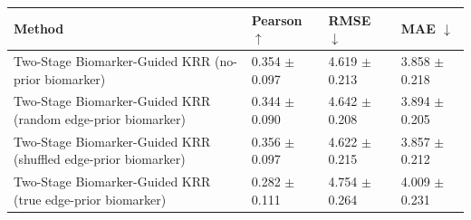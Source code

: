 \begin{tabular}{llll}
\toprule
Method & Pearson $\uparrow$ & RMSE $\downarrow$ & MAE $\downarrow$ \\
\midrule
Two-Stage Biomarker-Guided KRR (no-prior biomarker) & 0.354 $\pm$ 0.097 & 4.619 $\pm$ 0.213 & 3.858 $\pm$ 0.218 \\
Two-Stage Biomarker-Guided KRR (random edge-prior biomarker) & 0.344 $\pm$ 0.090 & 4.642 $\pm$ 0.208 & 3.894 $\pm$ 0.205 \\
Two-Stage Biomarker-Guided KRR (shuffled edge-prior biomarker) & 0.356 $\pm$ 0.097 & 4.622 $\pm$ 0.215 & 3.857 $\pm$ 0.212 \\
Two-Stage Biomarker-Guided KRR (true edge-prior biomarker) & 0.282 $\pm$ 0.111 & 4.754 $\pm$ 0.264 & 4.009 $\pm$ 0.231 \\
\bottomrule
\end{tabular}
